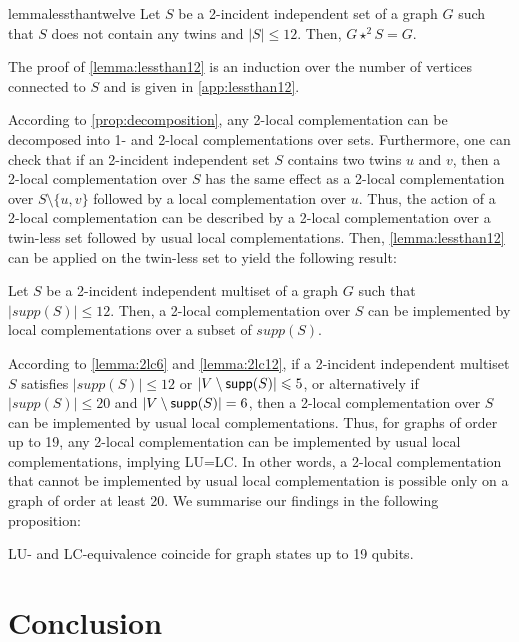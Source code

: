 \documentclass[a4paper,UKenglish,cleveref,autoref,thm-restate]{arxiv}
\newcommand{\ls}{\leqslant}
\newcommand{\sm}{\setminus}
\newcommand{\supp}{\textup{\textsf{supp}}}
\begin{document}
\begin{restatable}{lemma}{lessthantwelve} \label{lemma:lessthan12}
    Let $S$ be a 2-incident independent set of a graph $G$ such that $S$ does not contain any twins and $|S| \ls 12$. Then, $G \star^2 S = G$.
\end{restatable}

The proof of \cref{lemma:lessthan12} is an induction over the number of vertices connected to $S$ and is given in \cref{app:lessthan12}.

According to \cref{prop:decomposition}, any 2-local complementation can be decomposed into 1- and 2-local complementations over sets. Furthermore, one can check that if an 2-incident independent set $S$ contains two twins $u$ and $v$, then a 2-local complementation over $S$ has the same effect as a 2-local complementation over $S\sm\{u,v\}$ followed by a local complementation over $u$. Thus, the action of a 2-local complementation can be described by a 2-local complementation over a twin-less set followed by usual local complementations. Then, \cref{lemma:lessthan12} can be applied on the twin-less set to yield the following result:

\begin{lemma} \label{lemma:2lc12}
    Let $S$ be a 2-incident independent multiset of a graph $G$ such that $|supp(S)|\ls 12$. Then, a 2-local complementation over $S$ can be implemented by local complementations over a subset of $supp(S)$.
\end{lemma}

According to \cref{lemma:2lc6} and \cref{lemma:2lc12}, if a 2-incident independent multiset $S$ satisfies $|supp(S)|\ls 12$ or $|V\sm\supp(S)|\ls 5$, or alternatively if $|supp(S)|\ls 20$ and $|V\sm\supp(S)|= 6$, then a 2-local complementation over $S$ can be implemented by usual local complementations. Thus, for graphs of order up to 19, any 2-local complementation can be implemented by usual local complementations, implying LU=LC. In other words, a 2-local complementation that cannot be implemented by usual local complementation is possible only on a graph of order at least 20. We summarise our findings in the following proposition:

\begin{proposition} 
    LU- and LC-equivalence coincide for graph states up to 19 qubits.
\end{proposition}


\section{Conclusion}
\end{document}
